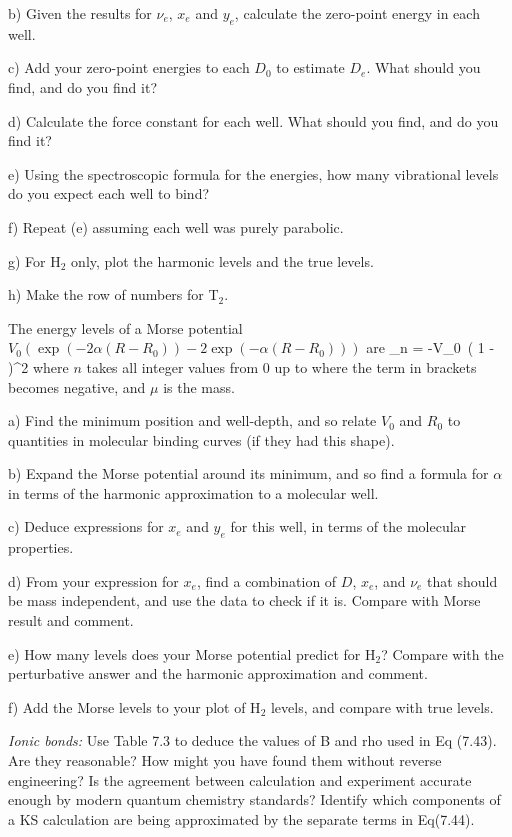 b) Given the results for $\nu_e$, $x_e$ and $y_e$, calculate the zero-point energy
in each well. 

c) Add your zero-point energies to each $D_0$ to estimate $D_e$.   What should you find,
and do you find it?

d) Calculate the force constant for each well.   What should you find, and do you find it?

e) Using the spectroscopic formula for the energies, how many vibrational levels do you
expect each well to bind?

f) Repeat (e) assuming each well was purely parabolic.

g) For H$_2$ only, plot the harmonic levels and the true levels.

h) Make the row of numbers for T$_2$.

\newpage


The energy levels of a Morse potential $V_0(\exp(-2\alpha (R-R_0)) -2 \exp(-\alpha (R-R_0)))$
are 
\ben
\epsilon_n = -V_0\, \left( 1 -  \right)^2
\een
where $n$ takes all integer values from 0 up to where the term in brackets 
becomes negative, and $\mu$ is the mass.

a) Find the minimum position and well-depth, and so relate $V_0$ and $R_0$ to quantities
in molecular binding curves (if they had this shape).

b) Expand the Morse potential around its minimum, and so find a formula for $\alpha$
in terms of the harmonic approximation to a molecular well.

c) Deduce expressions for $x_e$ and $y_e$ for this well, in terms of the molecular properties.

d) From your expression for $x_e$, find a combination of $D$, $x_e$, and $\nu_e$ that should be
mass independent, and use the data to check if it is.  Compare with Morse result and comment.

e) How many levels does your Morse potential predict for H$_2$?  Compare with the
perturbative answer and the harmonic approximation and comment.

f) Add the Morse levels to your plot of H$_2$ levels, and compare with true levels.


\newpage


\benu
\item
{\em Ionic bonds:} Use Table 7.3 to deduce the values of B and rho used in Eq (7.43).
Are they reasonable?
How might you have found them without reverse
engineering?
Is the agreement between calculation and experiment
accurate enough by modern quantum chemistry standards?
Identify which components of a KS calculation are being approximated
by the separate terms in  Eq(7.44).

